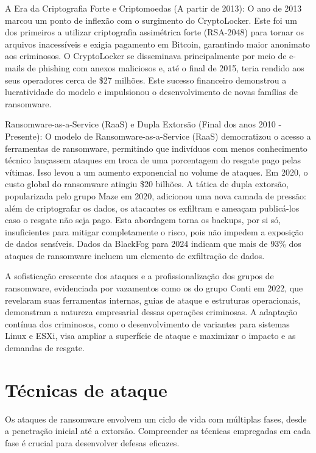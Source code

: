 A Era da Criptografia Forte e Criptomoedas (A partir de 2013): O ano de 2013 marcou um ponto de inflexão com o 
surgimento do CryptoLocker. Este foi um dos primeiros a utilizar criptografia assimétrica forte (RSA-2048) para tornar os 
arquivos inacessíveis e exigia pagamento em Bitcoin, garantindo maior anonimato aos criminosos. 
O CryptoLocker se disseminava principalmente por meio de e-mails de phishing com anexos maliciosos e, até o final de 2015, 
teria rendido aos seus operadores cerca de \$27 milhões. Este sucesso financeiro demonstrou a lucratividade do modelo e 
impulsionou o desenvolvimento de novas famílias de ransomware.

Ransomware-as-a-Service (RaaS) e Dupla Extorsão (Final dos anos 2010 - Presente): O modelo de Ransomware-as-a-Service (RaaS) 
democratizou o acesso a ferramentas de ransomware, permitindo que indivíduos com menos conhecimento técnico lançassem ataques 
em troca de uma porcentagem do resgate pago pelas vítimas. Isso levou a um aumento exponencial no volume de ataques. 
Em 2020, o custo global do ransomware atingiu \$20 bilhões.
A tática de dupla extorsão, popularizada pelo grupo Maze em 2020, adicionou uma nova camada de 
pressão: além de criptografar os dados, os atacantes os exfiltram e ameaçam publicá-los caso o resgate não seja pago. 
Esta abordagem torna os backups, por si só, insuficientes para mitigar completamente o risco, pois não impedem a exposição 
de dados sensíveis. Dados da BlackFog para 2024 indicam que mais de 93\% dos ataques de ransomware incluem um elemento de 
exfiltração de dados.



A sofisticação crescente dos ataques e a profissionalização dos grupos de ransomware, evidenciada 
por vazamentos como os do grupo Conti em 2022, que revelaram suas ferramentas internas, guias de ataque e 
estruturas operacionais, demonstram a natureza empresarial dessas operações criminosas. A adaptação contínua dos 
criminosos, como o desenvolvimento de variantes para sistemas Linux e ESXi, visa ampliar a superfície de ataque e maximizar o 
impacto e as demandas de resgate.

\section{Técnicas de ataque}

Os ataques de ransomware envolvem um ciclo de vida com múltiplas fases, desde a penetração inicial 
até a extorsão. Compreender as técnicas empregadas em cada fase é crucial para desenvolver defesas eficazes.

